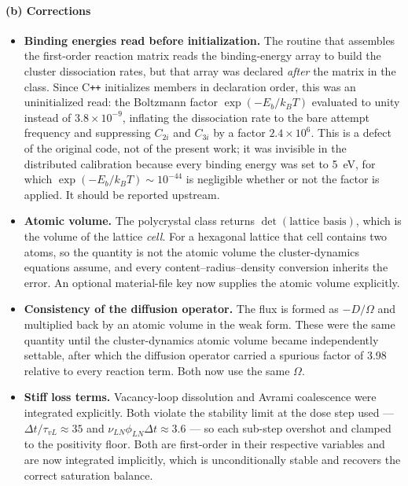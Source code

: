 \documentclass{article}
\begin{document}
\paragraph*{(b) Corrections}

\begin{itemize}
\item \textbf{Binding energies read before initialization.} The routine that
assembles the first-order reaction matrix reads the binding-energy array to build
the cluster dissociation rates, but that array was declared \emph{after} the
matrix in the class. Since C\texttt{++} initializes members in declaration order,
this was an uninitialized read: the Boltzmann factor $\exp(-E_b/k_BT)$ evaluated
to unity instead of $3.8\times 10^{-9}$, inflating the dissociation rate to the
bare attempt frequency and suppressing $C_{2i}$ and $C_{3i}$ by a factor
$2.4\times 10^{6}$. This is a defect of the original code, not of the present
work; it was invisible in the distributed calibration because every binding
energy was set to 5~eV, for which $\exp(-E_b/k_BT)\sim 10^{-44}$ is
negligible whether or not the factor is applied. It should be reported upstream.

\item \textbf{Atomic volume.} The polycrystal class returns
$\det(\text{lattice basis})$, which is the volume of the lattice \emph{cell}. For
a hexagonal lattice that cell contains two atoms, so the quantity is not the
atomic volume the cluster-dynamics equations assume, and every
content--radius--density conversion inherits the error. An optional material-file
key now supplies the atomic volume explicitly.

\item \textbf{Consistency of the diffusion operator.} The flux is formed as
$-D/\Omega$ and multiplied back by an atomic volume in the weak form. These were
the same quantity until the cluster-dynamics atomic volume became independently
settable, after which the diffusion operator carried a spurious factor of 3.98
relative to every reaction term. Both now use the same $\Omega$.

\item \textbf{Stiff loss terms.} Vacancy-loop dissolution and Avrami coalescence
were integrated explicitly. Both violate the stability limit at the dose step
used --- $\Delta t/\tau_{vL} \approx 35$ and $\nu_{LN}\phi_{LN}\Delta t \approx
3.6$ --- so each sub-step overshot and clamped to the positivity floor. Both are
first-order in their respective variables and are now integrated implicitly,
which is unconditionally stable and recovers the correct saturation balance.


\end{itemize}
\end{document}

